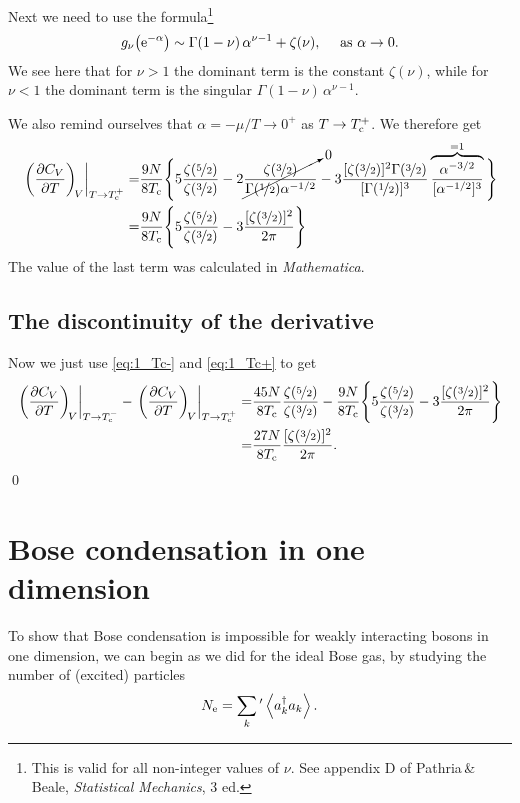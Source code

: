 \documentclass[11pt,letter, swedish, english
]{article}
\begin{document}
Next we need to use the formula\footnote{This is valid for all
  non-integer values of $\nu$. See appendix D of Pathria\,\&\,Beale,
  \textit{Statistical Mechanics}, 3 ed.} 
\begin{equation}
g_\nu\qty(\ee^{-\alpha})\sim
\Gamma(1-\nu)\,\alpha^{\nu-1}+\zeta(\nu)\qcomma \text{ as } \alpha\to0.
\end{equation}
We see here that for $\nu>1$ the dominant term is the constant
$\zeta(\nu)$, while for $\nu<1$ the dominant term is the singular
$\Gamma(1-\nu)\,\alpha^{\nu-1}$.

We also remind ourselves that $\alpha=-\mu/T\to0^+$ as $T\to T_{\text{c}}^+$. We
therefore get
\begin{equation}\label{eq:1_Tc+}
\begin{aligned}
\eval{\qty(\pdv{C_V}{T})_{\!V}}_{T\to\Tc^+}
=&\frac{9N}{8\Tc}\Bigg\{
5\frac{\zeta(\nicefrac{5}{2})}{\zeta(\nicefrac{3}{2})}
-2\cancelto{0}{\frac{\zeta(\nicefrac{3}{2})}
{\Gamma(\nicefrac{1}{2})\alpha^{{-}1/2}}}
-3\frac{[\zeta(\nicefrac{3}{2})]^2\Gamma(\nicefrac{3}{2})}
{[\Gamma(\nicefrac{1}{2})]^3}
\overbrace{\frac{\alpha^{-3/2}}{[\alpha^{-1/2}]^3}}^{=1}
\Bigg\}\\
=&\frac{9N}{8\Tc}\Bigg\{
5\frac{\zeta(\nicefrac{5}{2})}{\zeta(\nicefrac{3}{2})}
-3\frac{[\zeta(\nicefrac{3}{2})]^2}{2\pi}
\Bigg\}
\end{aligned}
\end{equation}
The value of the last term was calculated in \textit{Mathematica}.

\subsection{The discontinuity of the derivative}
Now we just use \eqref{eq:1_Tc-} and \eqref{eq:1_Tc+} to get
\begin{equation}
\begin{aligned}
\eval{\qty(\pdv{C_V}{T})_{\!V}}_{T\to\Tc^-}
-\eval{\qty(\pdv{C_V}{T})_{\!V}}_{T\to\Tc^+}
=&\frac{45N}{8\Tc}\frac{\zeta(\nicefrac{5}{2})}{\zeta(\nicefrac{3}{2})}
-\frac{9N}{8\Tc}\Bigg\{
5\frac{\zeta(\nicefrac{5}{2})}{\zeta(\nicefrac{3}{2})}
-3\frac{[\zeta(\nicefrac{3}{2})]^2}{2\pi}
\Bigg\}\\
=&\frac{27N}{8\Tc}\frac{[\zeta(\nicefrac{3}{2})]^2}{2\pi}.
\end{aligned}
\end{equation}
\qed

\section{Bose condensation in one dimension}
\newcommand{\Ne}{\ensuremath{N_{\text{e}}}}
To show that Bose condensation is impossible for weakly interacting
bosons in one dimension, we can begin as we did for the ideal Bose
gas, by studying the number of (excited) particles
\begin{equation}
\Ne=\sum_k{'}\ev{a^\dagger_ka_k}.
\end{equation}
\end{document}
